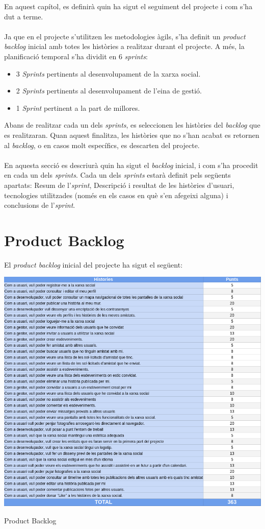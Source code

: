 \documentclass[11pt,catalan,listoffigures,listoftables]{tfgetsinf}
\begin{document}
En aquest capítol, es definirà quin ha sigut el seguiment del projecte i com s'ha dut a terme. \\ \\
Ja que en el projecte s'utilitzen les metodologies àgils, s'ha definit un \textit{product backlog} inicial amb totes les històries a realitzar durant el projecte. A més, la planificació temporal s'ha dividit en 6 \textit{sprints}:
\begin{itemize}
\item 3 \textit{Sprints} pertinents al desenvolupament de la xarxa social.
\item 2 \textit{Sprints} pertinents al desenvolupament de l'eina de gestió.
\item 1 \textit{Sprint} pertinent a la part de millores.
\end{itemize}
Abans de realitzar cada un dels \textit{sprints}, es seleccionen les històries del \textit{backlog} que es realitzaran. Quan aquest finalitza, les històries que no s'han acabat es retornen al \textit{backlog}, o en casos molt específics, es descarten del projecte.\\ \\
En aquesta secció es descriurà quin ha sigut el \textit{backlog} inicial, i com s'ha procedit en cada un dels \textit{sprints}. Cada un dels \textit{sprints} estarà definit pels següents apartats: Resum de l'\textit{sprint}, Descripció i resultat de les històries d'usuari, tecnologies utilitzades (només en els casos en què s'en afegeixi alguna) i conclusions de l'\textit{sprint}.
\newpage
\section{Product Backlog}

El \textit{product backlog} inicial del projecte ha sigut el següent:

\begin{table}[H]
\centering
\includegraphics[width=15cm]{images/taula8}
\caption[Taula 7.5]{Product Backlog}
\centering
\end{table}
\end{document}
